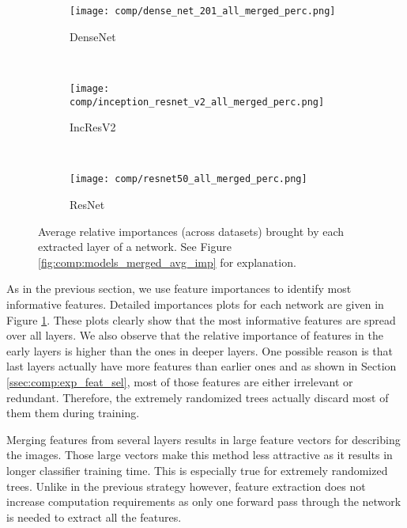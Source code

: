  
\begin{figure}
    \centering
    \begin{subfigure}[t]{0.8\textwidth}
        \centering
        \texttt{[image: comp/dense\_net\_201\_all\_merged\_perc.png]}
        \caption{DenseNet}
    \end{subfigure}\\
    \begin{subfigure}[t]{0.8\textwidth}
        \centering
        \texttt{[image: comp/inception\_resnet\_v2\_all\_merged\_perc.png]}
        \caption{IncResV2}
    \end{subfigure}\\
    \begin{subfigure}[t]{0.8\textwidth}
        \centering
        \texttt{[image: comp/resnet50\_all\_merged\_perc.png]}
        \caption{ResNet}
    \end{subfigure}
    \caption{Average relative importances (across datasets) brought by each extracted layer of a network. See Figure \ref{fig:comp:models_merged_avg_imp} for explanation.}
    \label{fig:comp:res_layers_merged_avg_imp}
\end{figure}

As in the previous section, we use feature importances to identify most informative features. Detailed importances plots for each network are given in Figure \ref{fig:comp:res_layers_merged_avg_imp}. These plots clearly show that the most informative features are spread over all layers. We also observe that the relative importance of features in the early layers is higher than the ones in deeper layers. One possible reason is that last layers actually have more features than earlier ones and as shown in Section \ref{ssec:comp:exp_feat_sel}, most of those features are either irrelevant or redundant. Therefore, the extremely randomized trees actually discard most of them them during training. 

Merging features from several layers results in large feature vectors for describing the images. Those large vectors make this method less attractive as it results in longer classifier training time. This is especially true for extremely randomized trees. Unlike in the previous strategy however, feature extraction does not increase computation requirements as only one forward pass through the network is needed to extract all the features.

